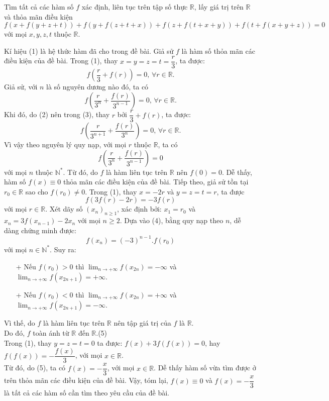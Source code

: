 \begin{bt}%
	Tìm tất cả các hàm số $f$ xác định, liên tục trên tập số thực $\mathbb{R}$, lấy giá trị trên $\mathbb{R}$ và thỏa mãn điều kiện \[f(x+f(y+z+t))+f(y+f(z+t+x))+f(z+f(t+x+y))+f(t+f(x+y+z))=0\] với mọi $x, y, z, t$ thuộc $\mathbb{R}$.
	\loigiai
	{Kí hiệu (1) là hệ thức hàm đã cho trong đề bài. Giả sử $f$ là hàm số thỏa mãn các điều kiện của đề bài. Trong (1), thay $x=y=z=t=\dfrac{r}{3}$, ta được: 
		\[f\left(\dfrac{r}{3}+f(r)\right)=0, \,\forall r\in \mathbb{R}.\tag{2}\]
		Giả sử, với $n$ là số nguyên dương nào đó, ta có \[f\left(\dfrac{r}{3^{n}}+\dfrac{f(r)}{3^{n-1}}\right)=0,\,\forall r\in \mathbb{R}.\tag{3}\]
		Khi đó, do (2) nên trong (3), thay $r$ bởi $\dfrac{r}{3}+f(r)$, ta được: \[f\left(\dfrac{r}{3^{n+1}}+\dfrac{f(r)}{3^{n}}\right)=0, \,\forall r\in \mathbb{R}.\]
		Vì vậy theo nguyên lý quy nạp, với mọi $r$ thuộc $\mathbb{R}$, ta có \[f\left(\dfrac{r}{3^{n}}+\dfrac{f(r)}{3^{n-1}}\right)=0\] với mọi $n$ thuộc $\mathbb{N^{*}}$. Từ đó, do $f$ là hàm liên tục trên $\mathbb{R}$ nên $f(0)=0$. Dễ thấy, hàm số $f(x)\equiv0$ thỏa mãn các điều kiện của đề bài. Tiếp theo, giả sử tồn tại $r_{0} \in \mathbb{R}$ sao cho $f(r_{0})\neq0$. Trong (1), thay $x=-2r$ và $y=z=t=r$, ta được \[f(3f(r)-2r)=-3f(r)\tag{4}\] với mọi $r\in\mathbb{R}$. Xét dãy số $(x_{n})_{n\geq1}$, xác định bởi: $x_{1}=r_{0}$ và $x_{n}=3f(x_{n-1})-2x_{n}$ với mọi $n\geq2$. Dựa vào (4), bằng quy nạp theo $n$, dễ dàng chứng minh được: \[f(x_{n})=(-3)^{n-1}.f(r_{0})\] với mọi $n\in\mathbb{N^{*}}$. Suy ra: 
		\begin{itemize}
			\item[+] Nếu $f(r_{0})>0$ thì $\displaystyle \lim_{n\to+\infty}f(x_{2n})=-\infty$ và $\displaystyle \lim_{n\to+\infty}f(x_{2n+1})=+\infty$.
			\item[+] Nếu $f(r_{0})<0$ thì $\displaystyle \lim_{n\to+\infty}f(x_{2n})=+\infty$ và $\displaystyle \lim_{n\to+\infty}f(x_{2n+1})=-\infty$.
		\end{itemize}
		Vì thế, do $f$ là hàm liên tục trên $\mathbb{R}$ nên tập giá trị của $f$ là $\mathbb{R}$. \\Do đó, $f$ toàn ánh từ $\mathbb{R}$ đến $\mathbb{R}$.\hfill(5)
		\\Trong (1), thay $y=z=t=0$ ta được: $f(x)+3f(f(x))=0$, hay $f(f(x))=-\dfrac{f(x)}{3}$, với mọi $x\in\mathbb{R}$. \\Từ đó, do (5), ta có $f(x)=-\dfrac{x}{3}$, với mọi $x\in\mathbb{R}$. Dễ thấy hàm số vừa tìm được ở trên thỏa mãn các điều kiện của đề bài. Vậy, tóm lại, $f(x)\equiv0$ và $f(x)=-\dfrac{x}{3}$ là tất cả các hàm số cần tìm theo yêu cầu của đề bài.
	}
\end{bt}
